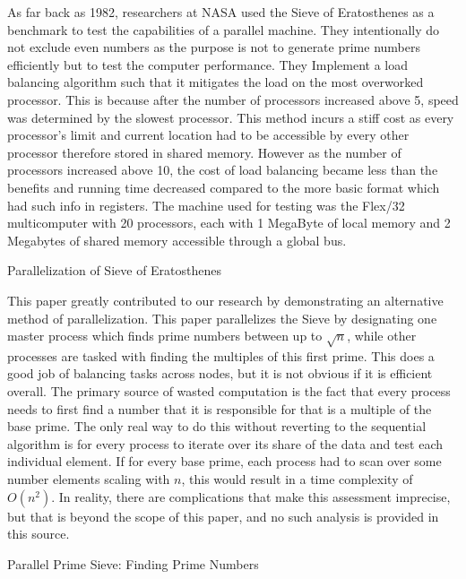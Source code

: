 \documentclass[11pt]{article}
\begin{document}
As far back as 1982, researchers at NASA used the Sieve of Eratosthenes as a 
benchmark to test the capabilities of a parallel machine. They intentionally do 
not exclude even numbers as the purpose is not to generate prime numbers efficiently 
but to test the computer performance. They Implement a load balancing algorithm such 
that it mitigates the load on the most overworked processor. This is because after the 
number of processors increased above 5, speed was determined by the slowest processor.
This method incurs a stiff cost as every processor's limit and current location had to
be accessible by every other processor therefore stored in shared memory. However as the
number of processors increased above 10, the cost of load balancing became less than the
benefits and running time decreased compared to the more basic format which had such 
info in registers. The machine used for testing was the Flex/32 multicomputer with
20 processors, each with 1 MegaByte of local memory and 2 Megabytes of shared memory 
accessible through a global bus.

Parallelization of Sieve of Eratosthenes

This paper greatly contributed to our research by demonstrating an alternative method of 
parallelization. This paper parallelizes the Sieve by designating one master process which 
finds prime numbers between up to $\sqrt{n}$, while other processes are tasked with finding 
the multiples of this first prime. This does a good job of balancing tasks across nodes, but 
it is not obvious if it is efficient overall. The primary source of wasted computation is the
fact that every process needs to first find a  number that it is responsible for that is a multiple
of the base prime. The only real way to do this without reverting to the sequential algorithm is for
every process to iterate over its share of the data and test each individual element. If for every 
base prime, each process had to scan over some number elements scaling with $n$, this would result 
in a time complexity of $O(n^2)$. In reality, there are complications that make this assessment 
imprecise, but that is beyond the scope of this paper, and no such analysis is provided in this source.


Parallel Prime Sieve: Finding Prime Numbers
\end{document}
